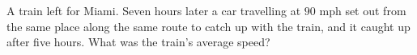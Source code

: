 A train left for Miami. Seven hours later a car travelling at $90$ mph set out from the same place along the same route to catch up with the train, and it caught up after five hours. What was the train's average speed?
